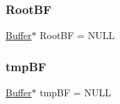 \subsubsection{\texorpdfstring{Root\+BF}{RootBF}}
{\footnotesize\ttfamily \mbox{\hyperlink{discreta_8h_a4966414b761cd8d10ba385fe5e7c07fc}{Buffer}}$\ast$ Root\+BF = N\+U\+LL}

\mbox{\label{btree_8_c_afd4515a2689560d6fcc14762a331ca77}} 
\subsubsection{\texorpdfstring{tmp\+BF}{tmpBF}}
{\footnotesize\ttfamily \mbox{\hyperlink{discreta_8h_a4966414b761cd8d10ba385fe5e7c07fc}{Buffer}}$\ast$ tmp\+BF = N\+U\+LL}

